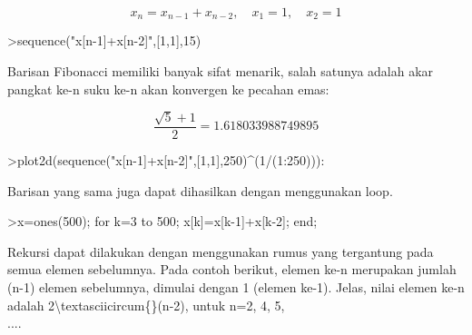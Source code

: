 \documentclass[a4paper,10pt]{article}
\begin{document}
\begin{eulernotebook}
\begin{eulercomment}
\begin{eulercomment}
\begin{eulercomment}
\begin{eulercomment}
\begin{eulercomment}
\begin{eulercomment}
\begin{eulercomment}
\begin{eulercomment}
\begin{eulercomment}
\begin{eulercomment}
\begin{eulercomment}
\begin{eulercomment}
\begin{eulercomment}
\begin{eulercomment}
\begin{eulercomment}
\begin{eulercomment}
\begin{eulercomment}
\begin{eulercomment}
\begin{eulercomment}
\begin{eulercomment}
\begin{eulercomment}
\begin{eulercomment}
\begin{eulercomment}
\begin{eulercomment}
\begin{eulercomment}
\begin{eulercomment}
\begin{eulercomment}
\begin{eulercomment}
\begin{eulercomment}
\end{eulercomment}
\begin{eulerformula}
\[
x_n = x_{n-1}+x_{n-2}, \quad x_1=1, \quad x_2 =1
\]
\end{eulerformula}
\begin{eulerprompt}
>sequence("x[n-1]+x[n-2]",[1,1],15)
\end{eulerprompt}
\begin{euleroutput}
  [1,  1,  2,  3,  5,  8,  13,  21,  34,  55,  89,  144,  233,  377,  610]
\end{euleroutput}
\begin{eulercomment}
Barisan Fibonacci memiliki banyak sifat menarik, salah satunya adalah
akar pangkat ke-n suku ke-n akan konvergen ke pecahan emas:
\end{eulercomment}
\begin{eulerformula}
\[
\frac{\sqrt{5}+1}{2}=1.618033988749895
\]
\end{eulerformula}
\begin{eulerprompt}
>plot2d(sequence("x[n-1]+x[n-2]",[1,1],250)^(1/(1:250))):
\end{eulerprompt}
\begin{eulercomment}
Barisan yang sama juga dapat dihasilkan dengan menggunakan loop.
\end{eulercomment}
\begin{eulerprompt}
>x=ones(500); for k=3 to 500; x[k]=x[k-1]+x[k-2]; end;
\end{eulerprompt}
\begin{eulercomment}
Rekursi dapat dilakukan dengan menggunakan rumus yang tergantung pada
semua elemen sebelumnya. Pada contoh berikut, elemen ke-n merupakan
jumlah (n-1) elemen sebelumnya, dimulai dengan 1 (elemen ke-1). Jelas,
nilai elemen ke-n adalah 2\textbackslash{}textasciicircum\{\}(n-2), untuk n=2, 4, 5,\\
....

\end{eulercomment}
\end{eulercomment}
\end{eulercomment}
\end{eulercomment}
\end{eulercomment}
\end{eulercomment}
\end{eulercomment}
\end{eulercomment}
\end{eulercomment}
\end{eulercomment}
\end{eulercomment}
\end{eulercomment}
\end{eulercomment}
\end{eulercomment}
\end{eulercomment}
\end{eulercomment}
\end{eulercomment}
\end{eulercomment}
\end{eulercomment}
\end{eulercomment}
\end{eulercomment}
\end{eulercomment}
\end{eulercomment}
\end{eulercomment}
\end{eulercomment}
\end{eulercomment}
\end{eulercomment}
\end{eulercomment}
\end{eulercomment}
\end{eulernotebook}
\end{document}
